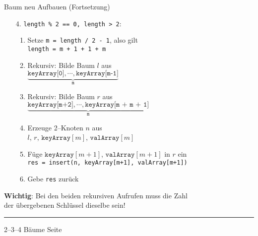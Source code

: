 
\begin{slide}{}
\normalsize

\begin{center}
Baum neu Aufbauen (Fortsetzung)
\end{center}
\vspace*{0.5cm}

\footnotesize
\begin{enumerate}
\item[4.] \texttt{length \% 2 == 0, length > 2}:
  \begin{enumerate}
  \item Setze \texttt{m = length / 2 - 1}, also gilt \\[0.3cm]
        \hspace*{1.3cm} \texttt{length = m + 1 + 1 + m }
  \item Rekursiv: Bilde Baum $l$ aus \\[0.3cm]
        \hspace*{1.3cm} $\underbrace{\texttt{keyArray[0]}, \cdots, \texttt{keyArray[m-1]}}_\mathtt{\displaystyle m}$
  \item Rekursiv: Bilde Baum $r$ aus \\[0.3cm]
        \hspace*{1.3cm} $\underbrace{\texttt{keyArray[m+2]}, \cdots, \texttt{keyArray[m + m + 1]}}_\mathtt{\displaystyle m}$
  \item Erzeuge 2--Knoten $n$ aus \\[0.3cm]
        \hspace*{1.3cm} $l$, $r$, $\texttt{keyArray}[m]$, $\mathtt{valArray}[m]$
  \item F\"uge $\texttt{keyArray}[m+1]$, $\mathtt{valArray}[m+1]$ in $r$ ein \\[0.3cm]
        \hspace*{1.3cm} \texttt{res = insert(n, keyArray[m+1], valArray[m+1])}
  \item Gebe \texttt{res} zur\"uck
  \end{enumerate}
\end{enumerate}
\textbf{Wichtig}: Bei den beiden rekursiven Aufrufen muss die Zahl \\
\hspace*{2.7cm} der \"ubergebenen Schl\"ussel dieselbe sein!


\vspace*{\fill}
\tiny \addtocounter{mypage}{1}
\rule{17cm}{1mm}
2--3--4 B\"aume  \hspace*{\fill} Seite 
\end{slide}

